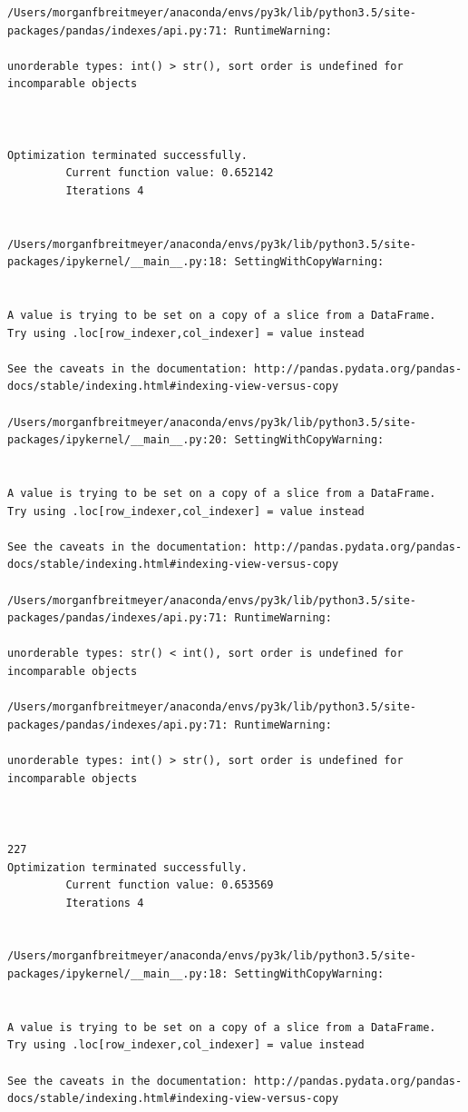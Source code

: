 \begin{lstlisting}
/Users/morganfbreitmeyer/anaconda/envs/py3k/lib/python3.5/site-packages/pandas/indexes/api.py:71: RuntimeWarning:

unorderable types: int() > str(), sort order is undefined for incomparable objects



Optimization terminated successfully.
         Current function value: 0.652142
         Iterations 4


/Users/morganfbreitmeyer/anaconda/envs/py3k/lib/python3.5/site-packages/ipykernel/__main__.py:18: SettingWithCopyWarning:


A value is trying to be set on a copy of a slice from a DataFrame.
Try using .loc[row_indexer,col_indexer] = value instead

See the caveats in the documentation: http://pandas.pydata.org/pandas-docs/stable/indexing.html#indexing-view-versus-copy

/Users/morganfbreitmeyer/anaconda/envs/py3k/lib/python3.5/site-packages/ipykernel/__main__.py:20: SettingWithCopyWarning:


A value is trying to be set on a copy of a slice from a DataFrame.
Try using .loc[row_indexer,col_indexer] = value instead

See the caveats in the documentation: http://pandas.pydata.org/pandas-docs/stable/indexing.html#indexing-view-versus-copy

/Users/morganfbreitmeyer/anaconda/envs/py3k/lib/python3.5/site-packages/pandas/indexes/api.py:71: RuntimeWarning:

unorderable types: str() < int(), sort order is undefined for incomparable objects

/Users/morganfbreitmeyer/anaconda/envs/py3k/lib/python3.5/site-packages/pandas/indexes/api.py:71: RuntimeWarning:

unorderable types: int() > str(), sort order is undefined for incomparable objects



227
Optimization terminated successfully.
         Current function value: 0.653569
         Iterations 4


/Users/morganfbreitmeyer/anaconda/envs/py3k/lib/python3.5/site-packages/ipykernel/__main__.py:18: SettingWithCopyWarning:


A value is trying to be set on a copy of a slice from a DataFrame.
Try using .loc[row_indexer,col_indexer] = value instead

See the caveats in the documentation: http://pandas.pydata.org/pandas-docs/stable/indexing.html#indexing-view-versus-copy


\end{lstlisting}
